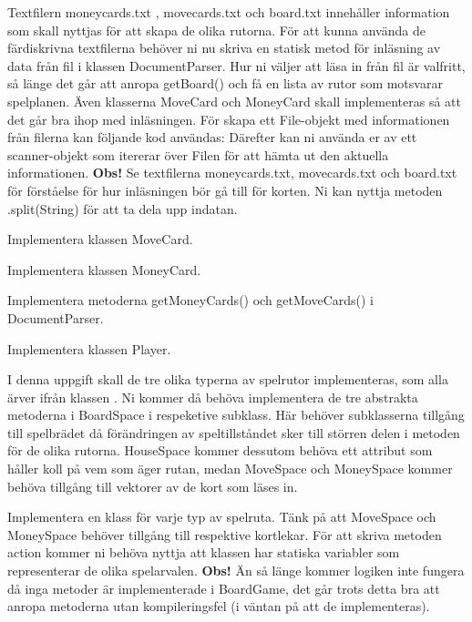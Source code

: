 \Task Textfilern moneycards.txt , movecards.txt och board.txt innehåller information som skall nyttjas för att skapa de olika rutorna. För att kunna använda de färdiskrivna textfilerna behöver ni nu skriva en statisk metod för inläsning av data från fil i klassen DocumentParser. Hur ni väljer att läsa in från fil är valfritt,  så länge det går att anropa getBoard() och få en lista av rutor som motsvarar spelplanen. Även klasserna MoveCard och MoneyCard skall implementeras så att det går bra ihop med inläsningen.
För skapa ett File-objekt med informationen från filerna kan följande kod användas:
\newline
\newline
{}
\newline
{}
\newline
\newline
Därefter kan ni använda er av ett scanner-objekt som itererar över Filen för att hämta ut den aktuella informationen.
\noindent
\textbf{Obs!} Se textfilerna moneycards.txt, movecards.txt och board.txt för förståelse för hur inläsningen bör gå till för korten.  Ni kan nyttja metoden .split(String) för att ta dela upp indatan.

\Subtask Implementera klassen MoveCard.

\Subtask Implementera klassen MoneyCard.

\Subtask Implementera metoderna getMoneyCards() och getMoveCards() i DocumentParser.

\Subtask Implementera klassen Player.

\Task I denna uppgift skall de tre olika typerna av spelrutor implementeras, som alla ärver ifrån klassen . Ni kommer då behöva implementera de tre abstrakta metoderna i BoardSpace i respeketive subklass. Här behöver subklasserna tillgång till spelbrädet då förändringen av speltillståndet sker till störren delen i metoden  för de olika rutorna. HouseSpace kommer dessutom behöva ett attribut som håller koll på vem som äger rutan, medan MoveSpace och MoneySpace kommer behöva tillgång till vektorer av de kort som läses in.

\Subtask Implementera en klass för varje typ av spelruta. Tänk på att MoveSpace och MoneySpace behöver tillgång till respektive kortlekar.
För att skriva metoden action kommer ni behöva nyttja att klassen  har statiska variabler som representerar de olika spelarvalen.
\newline
\newline
\noindent
\textbf{Obs!} Än så länge kommer logiken inte fungera då inga metoder är implementerade i BoardGame, det går trots detta bra att anropa metoderna utan kompileringsfel (i väntan på att de implementeras).



